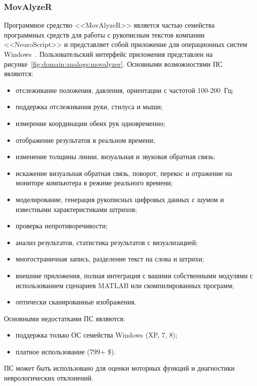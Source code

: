 \subsubsection{MovAlyzeR}
\label{sub:domain:analogs:movalyzer}
Программное средство <<MovAlyzeR>> является частью семейства программных средств для работы с рукописным текстов компании <<NeuroScript>> и представляет собой приложение для операционных систем Windows~\cite{analogs_movalyzer}. Пользовательский интерфейс приложения представлен на рисунке~\ref{fig:domain:analogs:movalyzer}.
Основными возможностями ПС являются:
\begin{itemize}
  \item отслеживание положения, давления, ориентации с частотой \mbox{100-200 Гц;}
  \item поддержка отслеживания руки, стилуса и мыши;
  \item измерение координации обеих рук одновременно;
  \item отображение результатов в реальном времени;
  \item изменение толщины линии, визуальная и звуковая обратная связь;
  \item искажение визуальная обратная связь, поворот, перекос и отражение на мониторе компьютера в режиме реального времени;
  \item моделирование, генерация рукописных цифровых данных с шумом и известными характеристиками штрихов;
  \item проверка непротиворечивости;
  \item анализ результатов, статистика результатов с визуализацией;
  \item многостраничная запись, разделение текст на слова и штрихи;
  \item внешние приложения, полная интеграция с вашими собственными модулями с использованием сценариев MATLAB или скомпилированных программ;
  \item оптически сканированные изображения.
\end{itemize}

Основными недостатками ПС являются:
\begin{itemize}
  \item поддержка только ОС семейства Windows (XP, 7, 8);
  \item платное использование (799+ \$).
\end{itemize}

ПС может быть использовано для оценки моторных функций и диагностики неврологических отклонений.

